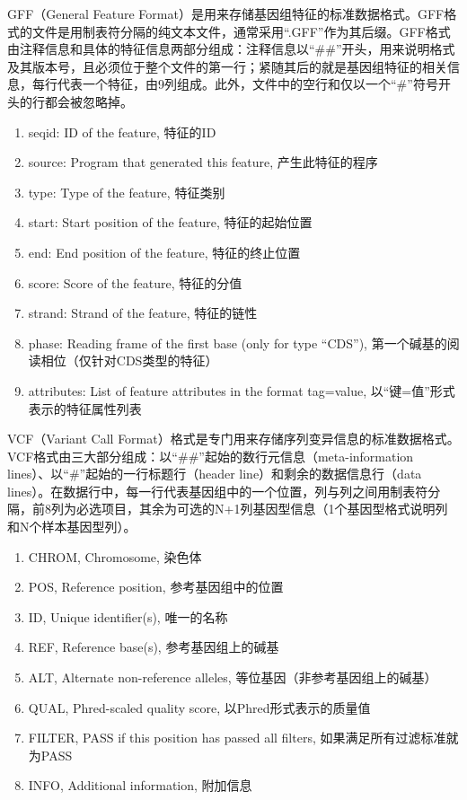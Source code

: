 GFF（General Feature Format）是用来存储基因组特征的标准数据格式。GFF格式的文件是用制表符分隔的纯文本文件，通常采用“.GFF”作为其后缀。GFF格式由注释信息和具体的特征信息两部分组成：注释信息以“\#\#”开头，用来说明格式及其版本号，且必须位于整个文件的第一行；紧随其后的就是基因组特征的相关信息，每行代表一个特征，由9列组成。此外，文件中的空行和仅以一个“\#”符号开头的行都会被忽略掉。
\begin{enumerate}
	\item seqid: ID of the feature, 特征的ID
	\item source: Program that generated this feature, 产生此特征的程序
	\item type: Type of the feature, 特征类别
	\item start: Start position of the feature, 特征的起始位置
	\item end: End position of the feature, 特征的终止位置
	\item score: Score of the feature, 特征的分值
	\item strand: Strand of the feature, 特征的链性
	\item phase: Reading frame of the first base (only for type ``CDS''), 第一个碱基的阅读相位（仅针对CDS类型的特征）
	\item attributes: List of feature attributes in the format tag=value, 以“键=值”形式表示的特征属性列表
\end{enumerate}

VCF（Variant Call Format）格式是专门用来存储序列变异信息的标准数据格式。VCF格式由三大部分组成：以“\#\#”起始的数行元信息（meta-information lines）、以“\#”起始的一行标题行（header line）和剩余的数据信息行（data lines）。在数据行中，每一行代表基因组中的一个位置，列与列之间用制表符分隔，前8列为必选项目，其余为可选的N+1列基因型信息（1个基因型格式说明列和N个样本基因型列）。
\begin{enumerate}
	\item CHROM, Chromosome, 染色体
	\item POS, Reference position, 参考基因组中的位置
	\item ID, Unique identifier(s), 唯一的名称
	\item REF, Reference base(s), 参考基因组上的碱基
	\item ALT, Alternate non-reference alleles, 等位基因（非参考基因组上的碱基）
	\item QUAL, Phred-scaled quality score, 以Phred形式表示的质量值
	\item FILTER, PASS if this position has passed all filters, 如果满足所有过滤标准就为PASS
	\item INFO, Additional information, 附加信息
\end{enumerate}

